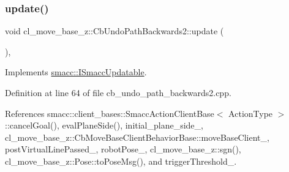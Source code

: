\subsubsection{\texorpdfstring{update()}{update()}}
{\footnotesize\ttfamily void cl\+\_\+move\+\_\+base\+\_\+z\+::\+Cb\+Undo\+Path\+Backwards2\+::update (\begin{DoxyParamCaption}{ }\end{DoxyParamCaption})\hspace{0.3cm}{\ttfamily [override]}, {\ttfamily [virtual]}}



Implements \hyperlink{classsmacc_1_1ISmaccUpdatable_a84ee0520cbefdb1d412bed54650b028e}{smacc\+::\+I\+Smacc\+Updatable}.



Definition at line 64 of file cb\+\_\+undo\+\_\+path\+\_\+backwards2.\+cpp.



References smacc\+::client\+\_\+bases\+::\+Smacc\+Action\+Client\+Base$<$ Action\+Type $>$\+::cancel\+Goal(), eval\+Plane\+Side(), initial\+\_\+plane\+\_\+side\+\_\+, cl\+\_\+move\+\_\+base\+\_\+z\+::\+Cb\+Move\+Base\+Client\+Behavior\+Base\+::move\+Base\+Client\+\_\+, post\+Virtual\+Line\+Passed\+\_\+, robot\+Pose\+\_\+, cl\+\_\+move\+\_\+base\+\_\+z\+::sgn(), cl\+\_\+move\+\_\+base\+\_\+z\+::\+Pose\+::to\+Pose\+Msg(), and trigger\+Threshold\+\_\+.


